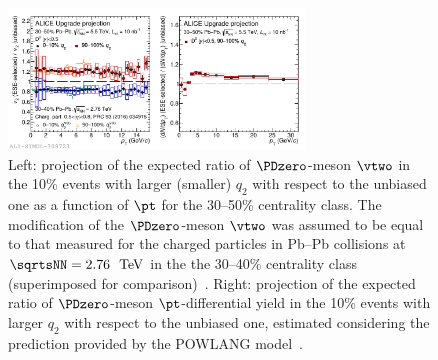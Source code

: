 \begin{figure}[ht]
  \begin{center}
    \includegraphics[width=0.7\textwidth]{hf/figures/ALICE_D0ESE_3050_upgradeprojection.pdf}
 
    \caption{Left: projection of the expected ratio of $\PDzero$-meson $\vtwo$ in the 10\% events with larger (smaller) $q_2$ with respect to the unbiased one as a function of $\pt$ for the 30--50\% centrality class. The modification of the $\PDzero$-meson $\vtwo$ was assumed to be equal to that measured for the charged particles in Pb--Pb collisions at $\sqrtsNN=2.76~{\UTeV}$ in the the 30--40\% centrality class (superimposed for comparison)~\cite{Adam:2015eta}. Right: projection of the expected ratio of $\PDzero$-meson $\pt$-differential yield in the 10\% events with larger $q_2$ with respect to the unbiased one, estimated considering the prediction provided by the POWLANG model~\cite{Beraudo:2018bxb}.}
    \label{fig:ESE}
  \end{center}
\end{figure}




